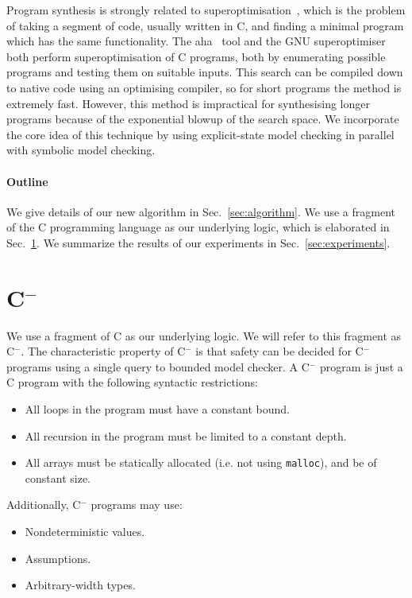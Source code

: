 \documentclass[a4paper]{llncs}
\newcommand{\newC}{C$^-$\xspace}
\begin{document}
Program synthesis is strongly related to
superoptimisation~\cite{superoptimisation}, which is the problem of taking a
segment of code, usually written in C, and finding a minimal program which
has the same functionality.  The {\sc aha}~\cite{aha} tool and the GNU
superoptimiser~\cite{gnu-superoptimiser} both perform superoptimisation of C
programs, both by enumerating possible programs and testing them on suitable
inputs.  This search can be compiled down to native code using an optimising
compiler, so for short programs the method is extremely fast.  However, this
method is impractical for synthesising longer programs because of the
exponential blowup of the search space.  We incorporate the core idea of
this technique by using explicit-state model checking in parallel with
symbolic model checking.

\paragraph{Outline} We give details of our new algorithm in
Sec.~\ref{sec:algorithm}.  We use a fragment of the C programming language
as our underlying logic, which is elaborated in Sec.~\ref{sec:logic}. We
summarize the results of our experiments in Sec.~\ref{sec:experiments}.


\section{\newC}
\label{sec:logic}

We use a fragment of C as our underlying logic.  We will refer to this fragment
as \newC.  The characteristic property of \newC is that safety can be decided for
\newC programs using a single query to bounded model checker.  A \newC program is
just a C program with the following syntactic restrictions:

\begin{itemize}
 \item All loops in the program must have a constant bound.
 \item All recursion in the program must be limited to a constant depth.
 \item All arrays must be statically allocated (i.e. not using \texttt{malloc}),
 and be of constant size.
\end{itemize}

Additionally, \newC programs may use:

\begin{itemize}
 \item Nondeterministic values.
 \item Assumptions.
 \item Arbitrary-width types.
\end{itemize}
\end{document}
